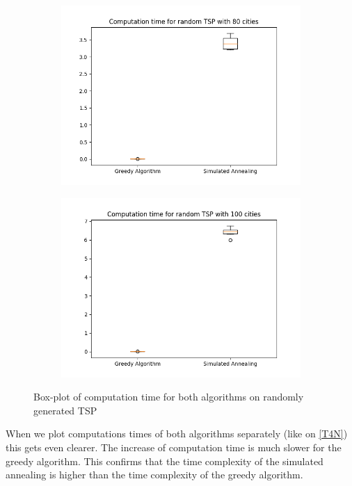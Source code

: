 \documentclass[14pt]
{article}
\begin{document}
\begin{figure}[H]
\begin{subfigure}{0.49\textwidth}
\includegraphics[width = \textwidth]{img/T80.png}
\end{subfigure}
\begin{subfigure}{0.49\textwidth}
\centering
\includegraphics[width = \textwidth]{img/T100.png}
\end{subfigure}
\caption{\label{TBoth} Box-plot of computation time for both algorithms on randomly generated TSP}
\end{figure}

When we plot computations times of both algorithms separately (like on \autoref{T4N}) this gets even clearer. The increase of computation time is much slower for the greedy algorithm. This confirms that the time complexity of the simulated annealing is higher than the time complexity of the greedy algorithm.
\end{document}
